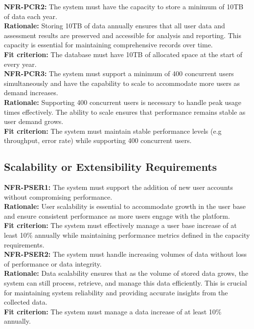 \documentclass[12pt]{article}
\begin{document}
\noindent\textbf{NFR-PCR2: }The system must have the capacity to store a minimum of 10TB of data each year.\\
\textbf{Rationale: }Storing 10TB of data annually ensures that all user data and assessment results are preserved and accessible for analysis and reporting. This capacity is essential for maintaining comprehensive records over time.\\
\textbf{Fit criterion: }The database must have 10TB of allocated space at the start of every year.\\

\noindent\textbf{NFR-PCR3: }The system must support a minimum of 400 concurrent users simultaneously and have the capability to scale to accommodate more users as demand increases.\\
\textbf{Rationale: }Supporting 400 concurrent users is necessary to handle peak usage times effectively. The ability to scale ensures that performance remains stable as user demand grows.\\
\textbf{Fit criterion: }The system must maintain stable performance levels (e.g throughput, error rate) while supporting 400 concurrent users.\\


\subsection{Scalability or Extensibility Requirements}

\noindent\textbf{NFR-PSER1: }The system must support the addition of new user accounts without compromising performance.\\
\textbf{Rationale: }User scalability is essential to accommodate growth in the user base and ensure consistent performance as more users engage with the platform.\\
\textbf{Fit criterion: }The system must effectively manage a user base increase of at least 10\% annually while maintaining performance metrics defined in the capacity requirements.\\

\noindent\textbf{NFR-PSER2: }The system must handle increasing volumes of data without loss of performance or data integrity.\\
\textbf{Rationale: }Data scalability ensures that as the volume of stored data grows, the system can still process, retrieve, and manage this data efficiently. This is crucial for maintaining system reliability and providing accurate insights from the collected data.\\
\textbf{Fit criterion: }The system must manage a data increase of at least 10\% annually.\\
\end{document}
